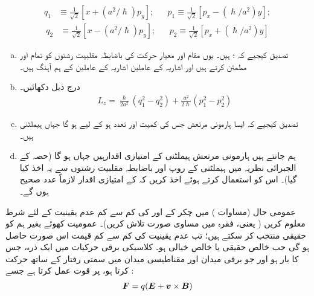 \begin{align*}
 q_1&\equiv \frac{1}{\sqrt{2}}[x+(a^2/\hslash)p_y]; && p_1\equiv\frac{1}{\sqrt{2}}[p_x-(\hslash/a^2)y];
\end{align*}
\begin{align*}
 q_2&\equiv\frac{1}{\sqrt{2}}[x-(a^2/\hslash)p_y]; &&p_2\equiv\frac{1}{\sqrt{2}}[p_x+(\hslash/a^2)y]
\end{align*}
\begin{enumerate}[a.]
\item
 تصدیق کیجیے کہ ؛  ہیں۔ یوں مقام اور معیار حرکت کی باضابطہ مقلبیت رشتوں کو تمام  اور  مطمئن کرتے ہیں اور اشاریہ  کے عاملین اشاریہ  کے عاملین کے ہم آہنگ ہیں۔
\item
 درج ذیل دکھائیں۔
\begin{align*}
 L_z=\frac{\hslash}{2a^2}(q_1^2-q_2^2)+\frac{a^2}{2\hslash}(p_1^2-p_2^2)
\end{align*}
\item
 تصدیق کیجیے کہ ایسا ہارمونی مرتعش جس کی کمیت  اور تعدد  ہو کے لیے ہو گا جہاں  ہیملٹنی ہیں۔ 
\item
 ہم جانتے ہیں ہارمونی مرتعش ہیملٹنی کے امتیازی اقدارہیں جہاں ہو گا
 (حصہ  کے الجبرائی نظریہ میں ہیملٹنی کے روپ اور
 باضابطہ مقلبیت رشتوں سے یہ اخذ کیا گیا)۔ اس کو استعمال کرتے ہوئے اخذ کریں کہ  کے امتیازی اقدار لازماً عدد صحیح ہوں گے۔
\end{enumerate}
عمومی حال (مساوات ) میں  چکر کے  اور  کی کم سے کم عدم یقینیت کے لئے شرط معلوم کریں ( یعنی، فقرہ  میں مساوی  صورت تلاش کریں)۔  عمومیت کھوئے بغیر ہم  کو حقیقی منتخب کر سکتے ہیں؛ تب عدم یقینیت کی کم سے کم قیمت اس صورت حاصل ہو گی جب  خالص حقیقی یا خالص خیالی ہو۔
کلاسیکی برقی حرکیات میں ایک ذرہ، جس کا بار  ہو اور جو برقی میدان  اور مقناطیسی میدان  میں سمتی رفتار  کے ساتھ حرکت کرتا ہو، پر قوت عمل کرتا ہے جسے :
 \begin{align}
 {\ensuremath{{\boldsymbol{F}}}}=q({{\boldsymbol{E}}}+{{\boldsymbol{v}}}\times{\ensuremath{{\boldsymbol{B}}}})
\end{align}
